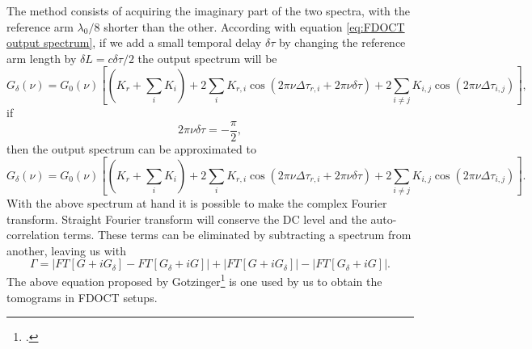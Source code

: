 \documentclass[12pt,twoside,english]{book}
\renewcommand{\~}{\perispomeni}%
\numberwithin{equation}{section}
\numberwithin{figure}{section}
\begin{document}
%
%
%
%



The method consists of acquiring the imaginary part of the two spectra, with the reference arm $\lambda_0/8$ shorter than the other. According with equation \ref{eq:FDOCT output spectrum}, if we add a small temporal delay $\delta\tau$ by changing the reference arm length by $\delta L=c\delta\tau/2$ the output spectrum will be
\begin{equation}
G_\delta\left(\nu\right)=G_{0}\left(\nu\right)\left[\left(K_{r}+\sum_{i}K_{i}\right)+2\sum_{i}K_{r,i}\cos\left(2\pi\nu\Delta\tau_{r,i}+2\pi\nu\delta\tau\right)+2\sum_{i\ne j}K_{i,j}\cos\left(2\pi\nu\Delta\tau_{i,j}\right)\right],
\label{eq:FDOCT output spectrum delay}
\end{equation}
if 
\begin{equation}
2\pi\nu\delta\tau=-\frac{\pi}{2},
\label{eq:quadrature condition}
\end{equation} 
then the output spectrum can be approximated to
\begin{equation}
G_\delta\left(\nu\right)=G_{0}\left(\nu\right)\left[\left(K_{r}+\sum_{i}K_{i}\right)+2\sum_{i}K_{r,i}\cos\left(2\pi\nu\Delta\tau_{r,i}+2\pi\nu\delta\tau\right)+2\sum_{i\ne j}K_{i,j}\cos\left(2\pi\nu\Delta\tau_{i,j}\right)\right].
\label{eq:FDOCT output spectrum sin}
\end{equation}
With the above spectrum at hand it is possible to make the complex Fourier transform. Straight Fourier transform will conserve the DC level and the auto-correlation terms. These terms can be eliminated by subtracting a spectrum from another, leaving us with
\begin{equation}
\Gamma=\left|FT\left[G+iG_{\delta}\right]-FT\left[G_{\delta}+iG\right]\right|+\left|FT\left[G+iG_{\delta}\right]\right|-\left|FT\left[G_{\delta}+iG\right]\right|.
\label{eq:quadrature equation}
\end{equation}
The above equation proposed by Gotzinger\footcite{Gotzinger:2005p1712} is one used by us to obtain the tomograms in FDOCT setups.
\end{document}
